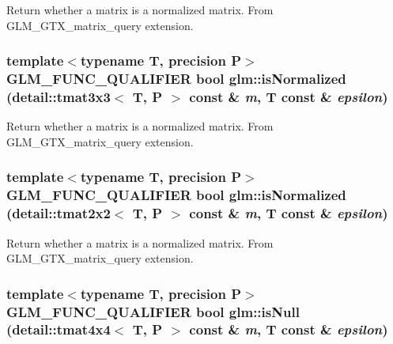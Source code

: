 Return whether a matrix is a normalized matrix. From GLM\_\-GTX\_\-matrix\_\-query extension. \hypertarget{group__gtx__matrix__query_g31396988209969ac17b2764cff154c36}{
\subsubsection[isNormalized]{\setlength{\rightskip}{0pt plus 5cm}template$<$typename T, precision P$>$ GLM\_\-FUNC\_\-QUALIFIER bool glm::isNormalized (detail::tmat3x3$<$ T, P $>$ const \& {\em m}, \/  T const \& {\em epsilon})}}
\label{group__gtx__matrix__query_g31396988209969ac17b2764cff154c36}


Return whether a matrix is a normalized matrix. From GLM\_\-GTX\_\-matrix\_\-query extension. \hypertarget{group__gtx__matrix__query_g08507235ac0ddb0a274ac1e1b10cbf39}{
\subsubsection[isNormalized]{\setlength{\rightskip}{0pt plus 5cm}template$<$typename T, precision P$>$ GLM\_\-FUNC\_\-QUALIFIER bool glm::isNormalized (detail::tmat2x2$<$ T, P $>$ const \& {\em m}, \/  T const \& {\em epsilon})}}
\label{group__gtx__matrix__query_g08507235ac0ddb0a274ac1e1b10cbf39}


Return whether a matrix is a normalized matrix. From GLM\_\-GTX\_\-matrix\_\-query extension. \hypertarget{group__gtx__matrix__query_g227812585b9411f506b157afcda55e9c}{
\subsubsection[isNull]{\setlength{\rightskip}{0pt plus 5cm}template$<$typename T, precision P$>$ GLM\_\-FUNC\_\-QUALIFIER bool glm::isNull (detail::tmat4x4$<$ T, P $>$ const \& {\em m}, \/  T const \& {\em epsilon})}}
\label{group__gtx__matrix__query_g227812585b9411f506b157afcda55e9c}


